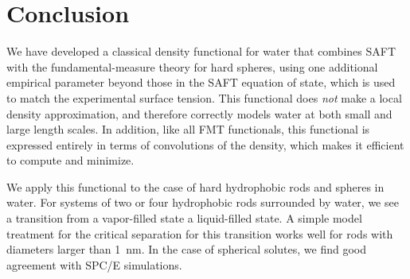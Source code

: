 \documentclass[twocolumn,amsmath,amssymb,prb]{revtex4-1}
\begin{document}
\section{Conclusion}

We have developed a classical density functional for water that
combines SAFT with the fundamental-measure theory for hard spheres,
using one additional empirical parameter beyond those in the SAFT
equation of state, which is used to match the experimental surface
tension.  This functional does \emph{not} make a local density
approximation, and therefore correctly models water at both small and
large length scales.  In addition, like all FMT functionals, this
functional is expressed entirely in terms of convolutions of the
density, which makes it efficient to compute and minimize.

We apply this functional to the case of hard hydrophobic rods and
spheres in water.  For systems of two or four hydrophobic rods
surrounded by water, we see a transition from a vapor-filled state a
liquid-filled state.  A simple model treatment for the critical
separation for this transition works well for rods with diameters
larger than 1~nm.  In the case of spherical solutes, we find good
agreement with SPC/E simulations.

\end{document}
